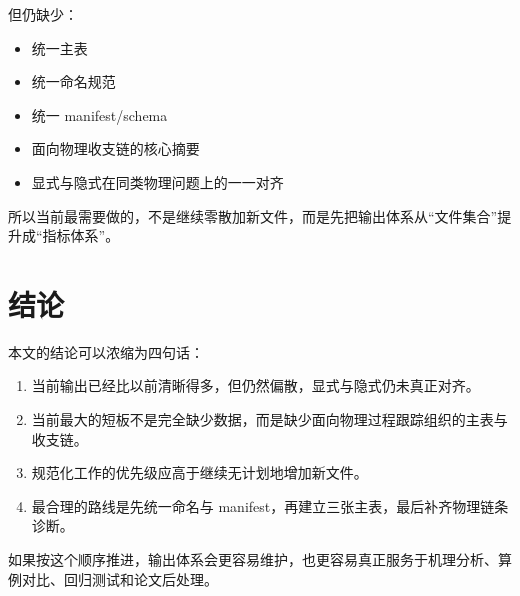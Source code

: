 \documentclass[11pt,a4paper]{ctexart}
\begin{document}
但仍缺少：

\begin{itemize}
  \item 统一主表
  \item 统一命名规范
  \item 统一 manifest/schema
  \item 面向物理收支链的核心摘要
  \item 显式与隐式在同类物理问题上的一一对齐
\end{itemize}

所以当前最需要做的，不是继续零散加新文件，而是先把输出体系从``文件集合''提升成``指标体系''。

\section{结论}

本文的结论可以浓缩为四句话：

\begin{enumerate}
  \item 当前输出已经比以前清晰得多，但仍然偏散，显式与隐式仍未真正对齐。
  \item 当前最大的短板不是完全缺少数据，而是缺少面向物理过程跟踪组织的主表与收支链。
  \item 规范化工作的优先级应高于继续无计划地增加新文件。
  \item 最合理的路线是先统一命名与 manifest，再建立三张主表，最后补齐物理链条诊断。
\end{enumerate}

如果按这个顺序推进，输出体系会更容易维护，也更容易真正服务于机理分析、算例对比、回归测试和论文后处理。
\end{document}
